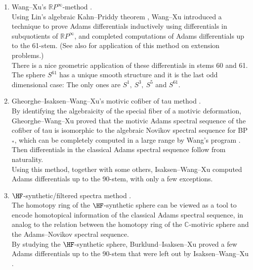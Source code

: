 \begin{enumerate}
    \item Wang--Xu's $\mathbb{R}P^\infty$-method \cite{WX61}.\\

    \noindent Using Lin's algebraic Kahn--Priddy theorem \cite{LinalgKP}, Wang--Xu introduced a technique to prove Adams differentials inductively using differentials in subquotients of $\mathbb{R}P^\infty$, and completed computations of Adams differentials up to the 61-stem. (See also \cite{WangXu51ext} for application of this method on extension problems.) \\

    \noindent There is a nice geometric application of these differentials in stems 60 and 61. The sphere $S^{61}$ has a unique smooth structure and it is the last odd dimensional case: The only ones are $S^1, \ S^3, \ S^5$ and $S^{61}$.\\

    \item Gheorghe--Isaksen--Wang--Xu's motivic cofiber of tau method \cite{GWX, IWX}. \\

    \noindent By identifying the algebraicity of the special fiber of a motivic deformation, Gheorghe--Wang--Xu \cite{GWX} proved that the motivic Adams spectral sequence of the cofiber of tau is isomorphic to the algebraic Novikov spectral sequence for BP$_*$, which can be completely computed in a large range by Wang's program \cite{Wang}. Then differentials in the classical Adams spectral sequence follow from naturality.\\ 
    
    \noindent Using this method, together with some others, Isaksen--Wang--Xu \cite{IWX} computed Adams differentials up to the 90-stem, with only a few exceptions. \\

    \item $\HF$-synthetic/filtered spectra method \cite{Pst, Burklund, BurklundXu, BurklundIsaksenXu}.\\

    \noindent The homotopy ring of the $\HF$-synthetic sphere \cite{Pst, BHS} can be viewed as a tool to encode homotopical information of the classical Adams spectral sequence, in analog to the relation between the homotopy ring of the $\mathbb{C}$-motivic sphere \cite{Isaksen} and the Adams--Novikov spectral sequence. \\

    \noindent By studying the $\HF$-synthetic sphere, Burklund--Isaksen--Xu \cite{BurklundIsaksenXu} proved a few Adams differentials up to the 90-stem that were left out by Isaksen--Wang--Xu \cite{IWX}.\\

    
\end{enumerate}

